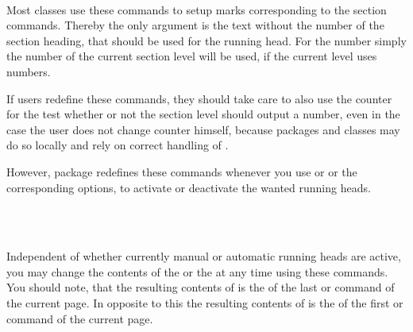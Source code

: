 \begin{Declaration}
  \\
  \\
  \\
  \\
  \\
  \\
\end{Declaration}
%
%
%
%
%
%
%
Most classes use these commands to setup marks corresponding to the
section commands. Thereby the only argument is the text without the number of
the section heading, that should be used for the running head. For the number
simply the number of the current section level will be used, if the current
level uses numbers.

If users redefine these commands, they should take care
to also use the counter  for the test whether or not the
section level should output a number, even in the case the user
does not change counter  himself, because packages and
classes may do so locally and rely on correct handling of
.

However, package  redefines these commands whenever you use
 or  or the corresponding options, to
activate or deactivate the wanted running heads.%
%
%
%
%
%
%
%
%

\begin{Declaration}
  \\
  \\
\end{Declaration}
%
%
%
Independent of whether currently manual or automatic running heads are active,
you may change the contents of the  or the 
at any time using these commands. You should note, that the resulting contents
of  is the  of the last  or  command of the
current page. In opposite to this the resulting contents of
 is the  of the first
 or  command of the current page.

